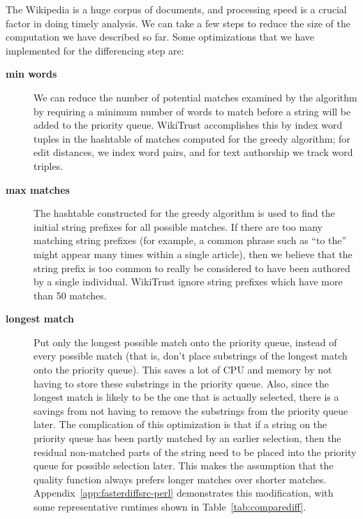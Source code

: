 The Wikipedia is a huge corpus of documents, and processing speed
is a crucial factor in doing timely analysis.
We can take a few steps to reduce the size of the computation
we have described so far.
Some optimizations that we have implemented for the differencing
step are:
%
\begin{description}
\item[\textbf{min words}] 
    We can reduce the number of potential matches examined
    by the algorithm by requiring a minimum number of words to match
    before a string will be added to the priority queue.
    WikiTrust accomplishes this by index word tuples in the
    hashtable of matches computed for the greedy algorithm;
    for edit distances, we index word pairs, and for text authorship
    we track word triples.

\item[\textbf{max matches}]
    The hashtable constructed for the greedy algorithm is used
    to find the initial string prefixes for all possible matches.
    If there are too many matching string prefixes (for example,
    a common phrase such as ``to the'' might appear many times
    within a single article), then we believe that the string prefix
    is too common to really be considered to have been authored
    by a single individual.
    WikiTrust ignore string prefixes which have more than 50 matches.

\item[\textbf{longest match}] Put only the longest possible match
    onto the priority queue, instead of every possible match (that is, don't
    place substrings of the longest match onto the priority queue).
    This saves a lot of CPU and memory by not having to store
    these substrings in the priority queue.
    Also, since the longest match is likely to be the one that is
    actually selected, there is a savings from not having to remove
    the substrings from the priority queue later.
    The complication of this optimization is that if a string on
    the priority queue has been partly matched by an earlier selection,
    then the residual non-matched parts of the string need to
    be placed into the priority queue for possible selection later.
    This makes the assumption that the quality function always
    prefers longer matches over shorter matches.
    Appendix~\ref{app:fasterdiffsrc-perl} demonstrates this
    modification, with some representative runtimes shown
    in Table~\ref{tab:comparediff}.


\end{description}
